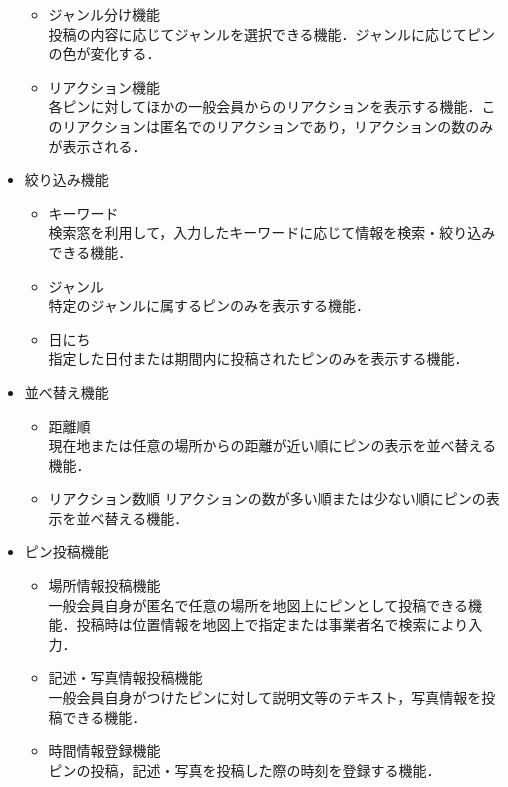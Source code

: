 \begin{itemize}[itemsep=10pt]
\begin{itemize}[itemsep=10pt]
        \item ジャンル分け機能 \mbox{}\\
        投稿の内容に応じてジャンルを選択できる機能．ジャンルに応じてピンの色が変化する．
        \item  リアクション機能 \mbox{}\\
        各ピンに対してほかの一般会員からのリアクションを表示する機能．このリアクションは匿名でのリアクションであり，リアクションの数のみが表示される．
    \end{itemize}
    \item 絞り込み機能
    \begin{itemize}[itemsep=10pt]
        \item キーワード \mbox{} \\
        検索窓を利用して，入力したキーワードに応じて情報を検索・絞り込みできる機能．
        \item ジャンル \mbox{}\\
        特定のジャンルに属するピンのみを表示する機能．
        \item 日にち \mbox{}\\
        指定した日付または期間内に投稿されたピンのみを表示する機能．
    \end{itemize}
    \item 並べ替え機能
    \begin{itemize}[itemsep=10pt]
        \item 距離順 \mbox{} \\
        現在地または任意の場所からの距離が近い順にピンの表示を並べ替える機能．
        \item リアクション数順
        リアクションの数が多い順または少ない順にピンの表示を並べ替える機能．
    \end{itemize}
    \item ピン投稿機能
    \begin{itemize}[itemsep=10pt]
        \item 場所情報投稿機能 \mbox{}\\
        一般会員自身が匿名で任意の場所を地図上にピンとして投稿できる機能．投稿時は位置情報を地図上で指定または事業者名で検索により入力．
        \item 記述・写真情報投稿機能 \mbox{}\\
        一般会員自身がつけたピンに対して説明文等のテキスト，写真情報を投稿できる機能．
        \item 時間情報登録機能 \mbox{}\\
        ピンの投稿，記述・写真を投稿した際の時刻を登録する機能．

\end{itemize}
\end{itemize}
